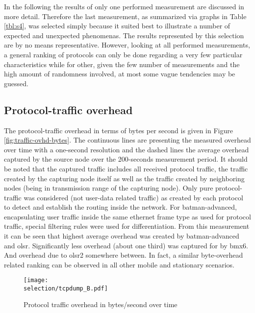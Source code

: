 \documentclass[a4paper,12pt,twoside]{article}
\begin{document}
\newcommand{\selection}{test_data/wbmv7-axn-16_2014-05-16_19-28-43/wbmv7-axn-16_2014-05-16_19-28-43_wibed-f41ab0/wbm-axn} 

In the following the results of only one performed measurement are
discussed in more detail. Therefore the last measurement, as summarized
via graphs in Table \ref{tbl:s4}, was selected simply because it
suited best to illustrate a number of expected and unexpected
phenomenas. The results represented by this selection are by no means
representative. However, looking at all performed measurements, a
general ranking of protocols can only be done regarding a very few
particular characteristics while for other, given the few number of
measurements and the high amount of randomness involved, at most some
vague tendencies may be guessed.

\subsection{Protocol-traffic overhead}

The protocol-traffic overhead in terms of bytes per second is given in
Figure \ref{fig:traffic-ovhd-bytes}.  The continuous lines are
presenting the measured overhead over time with a one-second
resolution and the dashed lines the average overhead captured by the
source node over the 200-seconds measurement period. It should be
noted that the captured traffic includes all received protocol
traffic, the traffic created by the capturing node itself as well as
the traffic created by neighboring nodes (being in transmission range
of the capturing node). Only pure protocol-traffic was considered (not
user-data related traffic) as created by each protocol to detect and
establish the routing inside the network. For batman-advanced,
encapsulating user traffic inside the same ethernet frame type as used
for protocol traffic, special filtering rules were used for
differentiation.
From this measurement it can be seen that highest average overhead was
created by batman-advanced and olsr. Significantly less overhead
(about one third) was captured for by bmx6. And overhead due to olsr2
somewhere between. In fact, a similar byte-overhead related ranking can
be observed in all other mobile and stationary scenarios.

\begin{figure}[!ht]
\centering
\texttt{[image: \\selection/tcpdump\_B.pdf]}
\caption{Protocol traffic overhead in bytes/second over time}
\label{fig:traffic-ovhd-packets}
\end{figure}
\end{document}
